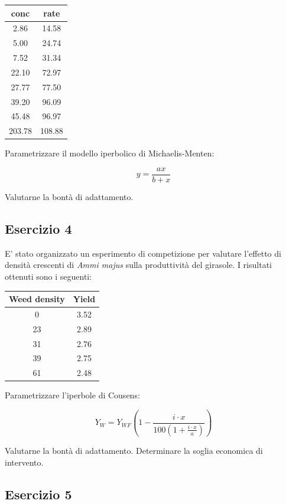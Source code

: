 \documentclass[a4paper,12pt,oneside]{book}
\begin{document}
\begin{longtable}[]{@{}cc@{}}
\toprule
conc & rate \\
\midrule
\endhead
2.86 & 14.58 \\
5.00 & 24.74 \\
7.52 & 31.34 \\
22.10 & 72.97 \\
27.77 & 77.50 \\
39.20 & 96.09 \\
45.48 & 96.97 \\
203.78 & 108.88 \\
\bottomrule
\end{longtable}

Parametrizzare il modello iperbolico di Michaelis-Menten:

\[y = \frac{a x} {b + x}\]

Valutarne la bontà di adattamento.

\hypertarget{esercizio-4-7}{%
\subsection{Esercizio 4}\label{esercizio-4-7}}

E' stato organizzato un esperimento di competizione per valutare l'effetto di densità crescenti di \emph{Ammi majus} sulla produttività del girasole. I risultati ottenuti sono i seguenti:

\begin{longtable}[]{@{}cc@{}}
\toprule
Weed density & Yield \\
\midrule
\endhead
0 & 3.52 \\
23 & 2.89 \\
31 & 2.76 \\
39 & 2.75 \\
61 & 2.48 \\
\bottomrule
\end{longtable}

Parametrizzare l'iperbole di Cousens:

\[Y_W  = Y_{WF} \left( 1 - \frac{i \cdot x}{100\left( 1 + \frac{i \cdot x}{a} \right)} \right)\]

Valutarne la bontà di adattamento. Determinare la soglia economica di intervento.

\hypertarget{esercizio-5-6}{%
\subsection{Esercizio 5}\label{esercizio-5-6}}
\end{document}
